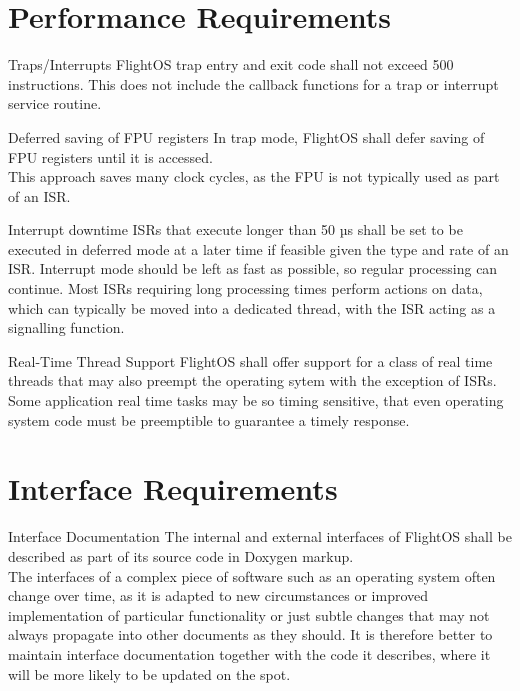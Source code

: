 \section{Performance Requirements}

 {Traps/Interrupts}{%
FlightOS trap entry and exit code shall not exceed 500 instructions.
}{%
This does not include the callback functions for a trap or interrupt
service routine.
}%

 {Deferred saving of \gls{FPU} registers}{%
In trap mode, FlightOS shall defer saving of \gls{FPU} registers until it is
accessed.\\


}{%
This approach saves many clock cycles, as the \gls{FPU} is not typically used
as part of an \gls{ISR}.
}%


 {Interrupt downtime}{%
\glspl{ISR} that execute longer than 50 µs shall be set to be executed in
deferred mode at a later time if feasible given the type and rate of an \gls{ISR}.
}{
Interrupt mode should be left as fast as possible, so regular processing can
continue. Most \glspl{ISR} requiring long processing times perform actions on
data, which can typically be moved into a dedicated thread, with the \gls{ISR}
acting as a signalling function.
}%

 {Real-Time Thread Support}{%
FlightOS shall offer support for a class of real time threads that may also
preempt the operating sytem with the exception of \glspl{ISR}.
}{%
Some application real time tasks may be so timing sensitive, that even
operating system code must be preemptible to guarantee a timely response.
}%

\section{Interface Requirements}

 {Interface Documentation}{%
The internal and external interfaces of FlightOS shall be described as part
of its source code in Doxygen markup.\\

}{
The interfaces of a complex piece of software such as an operating system
often change over time, as it is adapted to new circumstances or improved
implementation of particular functionality or just subtle changes that may not
always propagate into other documents as they should. It is therefore better to
maintain interface documentation together with the code it describes, where it
will be more likely to be updated on the spot.
}%


